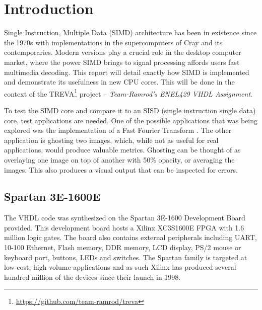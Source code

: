\section{Introduction}

 Single Instruction, Multiple Data (SIMD) architecture has been in 
existence since the 1970s with implementations in the supercomputers of Cray 
and its contemporaries. Modern versions play a crucial role in the 
desktop computer market, where the power SIMD brings to signal
processing affords users fast multimedia decoding\cite{bonnot2008definition}. This
report will detail exactly how SIMD is implemented and demonstrate its usefulness
in new CPU cores.  This will be done in the context of the
TREVA\footnote{\url{https://github.com/team-ramrod/treva}} project --
\emph{Team-Ramrod's ENEL429 VHDL Assignment}.




To test the SIMD core  and compare it to an SISD (single instruction single data) core, test applications are
needed. One of the possible applications that was being explored was the
implementation of a Fast Fourier Transform \cite{Jamieson198648}. The other
application is ghosting two images, which, while not as useful for real applications, would
produce valuable metrics. Ghosting can be thought of as overlaying one image
on top of another with 50\% opacity, or averaging the images. This also produces a visual output
that can be inspected for errors.


\subsection{Spartan 3E-1600E}
The VHDL code was synthesized on the Spartan 3E-1600 Development Board
provided. This development board hosts a Xilinx XC3S1600E FPGA with 1.6 million
logic gates. The board also contains external peripherals
including UART, 10-100 Ethernet, Flash memory, DDR memory, LCD display, PS/2
mouse or keyboard port, buttons, LEDs and switches. The Spartan family is targeted
at low cost, high volume applications and as such Xilinx has produced several hundred million
of the devices\cite{xilinxpress} since their launch in 1998.



